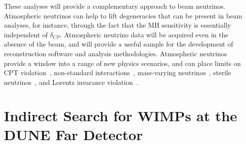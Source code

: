 


These analyses will provide a complementary approach to beam neutrinos.   Atmospheric neutrinos can 
help to lift degeneracies that can be present in beam analyses, for instance, through the fact that the 
MH sensitivity is essentially independent of $\delta_{CP}$.   Atmospheric neutrino data will be acquired 
even in the absence of the beam, and will provide a useful sample for the development of 
reconstruction software and analysis methodologies.  
Atmospheric neutrinos provide a window into a range of new physics scenarios, and can place limits
on CPT violation~\cite{Kostelecky:2003cr}, 
non-standard interactions~\cite{Chatterjee:2014gxa}, mass-varying neutrinos~\cite{Abe:2008zza}, 
sterile neutrinos~\cite{Abe:2014gda}, and
Lorentz invarance violation~\cite{Kostelecky:2011gq}.

\section{Indirect Search for WIMPs at the DUNE Far Detector}

